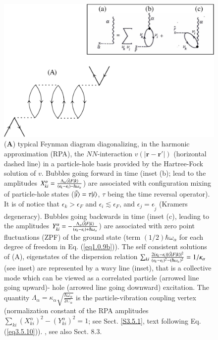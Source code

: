 \begin{figure}
	\centerline {
		\includegraphics*[width=12cm]{introduccion/figs/figpreface7}
	}
	\caption{ (\textbf{A}) typical Feynman diagram diagonalizing, in the harmonic approximation (RPA), the $NN$-interaction $v(|\mathbf r-\mathbf r'|)$ (horizontal dashed line) in a particle-hole basis provided by the Hartree-Fock solution of $v$. Bubbles going forward in time (inset (b); lead to the amplitudes $X^\alpha_{ki}=\frac{\Lambda_\alpha\langle {\tilde i|F|k} \rangle}{(\epsilon_k-\epsilon_i)-\hbar\omega_\alpha}$) are associated with configuration mixing of particle-hole states  ($|{\tilde i} \rangle=\tau|{i} \rangle$,  $\tau$ being the time reversal operator). It is of notice that $\epsilon_k>\epsilon_F$ and $\epsilon_i\lesssim\epsilon_F$, and $\epsilon_j=\epsilon_{\widetilde j}$ (Kramers degeneracy). Bubbles going backwards in time (inset (c), leading to the amplitudes $Y^\alpha_{ki}=-\frac{\Lambda_\alpha\langle {\tilde i|F|k} \rangle}{(\epsilon_k-\epsilon_i)+\hbar\omega_\alpha}$) are associated with zero point  fluctuations (ZPF) of the ground state (term $(1/2)\hbar\omega_\alpha$ for each degree of freedom in Eq. (\ref{eq1.0.9b})). The self consistent solutions of (A), eigenstates of the dispersion relation $\sum_{ki}\frac{2(\epsilon_k-\epsilon_i)|\langle {\tilde i|F|k} \rangle|^2}{(\epsilon_k-\epsilon_i)^2-(\hbar\omega_\alpha)^2}=1/\kappa_\alpha$ (see inset) are represented by a wavy line (inset), that is a collective mode which can be viewed as a correlated particle (arrowed line going upward)- hole (arrowed line going downward) excitation. The quantity $\Lambda_\alpha=\kappa_\alpha\sqrt{\frac{\hbar\omega_\alpha}{2C_\alpha}}$ is the particle-vibration coupling vertex (normalization constant of the RPA amplitudes $\sum_{ki}\left(X^\alpha_{ki}\right)^2-\left(Y^\alpha_{ki}\right)^2=1$; see Sect. \ref{S3.5.1}, text following Eq. (\ref{eq3.5.10})). \cite{Bohm:51,Bohm:53}, see also \cite{Brink:05} Sect. 8.3.}
	\label{fig1.0.7}
\end{figure}

